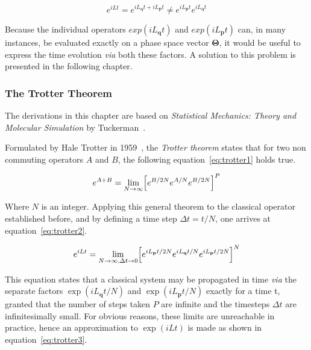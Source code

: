 \documentclass[11pt]{article}
\begin{document}
\begin{equation}
  e^{iLt} = e^{iL_{\textbf{q}}t + iL_{\textbf{p}}t} \neq e^{iL_{\textbf{p}}t}e^{iL_{\textbf{q}}t}
  \label{eq:hamilton13}
\end{equation}

\bigskip

\noindent Because the individual operators $exp(iL_{\textbf{q}}t)$ and $exp(iL_{\textbf{p}}t)$ can, in many instances, be evaluated exactly on a phase space vector $\mathbf{\Theta}$, it would be useful to express the time evolution \textit{via} both these factors. A solution to this problem is presented in the following chapter.

\subsubsection{The Trotter Theorem}
The derivations in this chapter are based on \textit{Statistical Mechanics: Theory and Molecular Simulation} by Tuckerman~\cite{Tuckerman2010}.
\\ \par \noindent Formulated by Hale Trotter in 1959~\cite{Trotter1959}, the \textit{Trotter theorem} states that for two non commuting operators $A$ and $B$, the following equation~\ref{eq:trotter1} holds true.

\begin{equation}
  e^{A+B} = \lim_{N \to \infty} \Bigl[e^{B/2N}e^{A/N}e^{B/2N}\Bigl]^P
  \label{eq:trotter1}
\end{equation}

\bigskip

\noindent Where $N$ is an integer. Applying this general theorem to the classical operator established before, and by defining a time step $\Delta t = t/N$, one arrives at equation~\ref{eq:trotter2}.

\begin{equation}
  e^{iLt} = \lim_{N \to \infty , \Delta t \to 0} \Bigl[e^{iL_{\textbf{p}}t/2N}e^{iL_{\textbf{q}}t/N}e^{iL_{\textbf{p}}t/2N}\Bigl]^N
  \label{eq:trotter2}
\end{equation}

\bigskip

\noindent This equation states that a classical system may be propagated in time \textit{via} the separate factors $\exp(iL_{\textbf{q}}t/N)$ and $\exp(iL_{\textbf{p}}t/N)$ exactly for a time t, granted that the number of steps taken $P$ are infinite and the timesteps $\Delta t$ are infinitesimally small. For obvious reasons, these limits are unreachable in practice, hence an approximation to $\exp(iLt)$ is made as shown in equation~\ref{eq:trotter3}.
\end{document}
